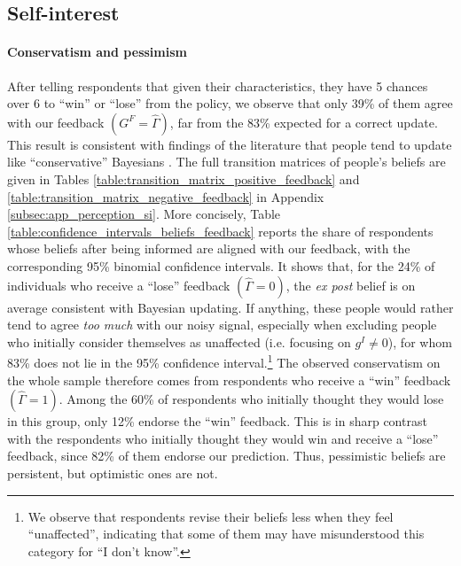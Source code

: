 \documentclass[11pt]{article}
\begin{document}

	\subsection{Self-interest}\label{subsec:update_si}

\paragraph{Conservatism and pessimism}

After telling respondents that given their characteristics, they have 5 chances over 6 to ``win'' or ``lose'' from the policy, we observe that only 39\% of them agree with our feedback $(G^F = \widehat{\Gamma})$, far from the 83\% expected for a correct update. This result is consistent with findings of the literature that people tend to update like ``conservative'' Bayesians \citep{edwards_conservatism_1968}. The full transition matrices of people's beliefs are given in Tables \ref{table:transition_matrix_positive_feedback} and \ref{table:transition_matrix_negative_feedback} in Appendix \ref{subsec:app_perception_si}. More concisely, Table \ref{table:confidence_intervals_beliefs_feedback} reports the share of respondents whose beliefs after being informed are aligned with our feedback, with the corresponding 95\% binomial confidence intervals. It shows that, for the 24\% of individuals who receive a ``lose'' feedback $(\widehat{\Gamma} = 0)$, the \textit{ex post} belief is on average consistent with Bayesian updating. If anything, these people would rather tend to agree \textit{too much} with our noisy signal, especially when excluding people who initially consider themselves as unaffected (i.e. focusing on $g^I \neq 0$), for whom 83\% does not lie in the 95\% confidence interval.\footnote{We observe that respondents revise their beliefs less when they feel ``unaffected'', indicating that some of them may have misunderstood this category for ``I don't know''.} The observed conservatism on the whole sample therefore comes from respondents who receive a ``win'' feedback $(\widehat{\Gamma} = 1)$. Among the 60\% of respondents who initially thought they would lose in this group, only 12\% endorse the ``win'' feedback. This is in sharp contrast with the respondents who initially thought they would win and receive a ``lose'' feedback, since 82\% of them endorse our prediction. Thus, pessimistic beliefs are persistent, but optimistic ones are not.
\end{document}
